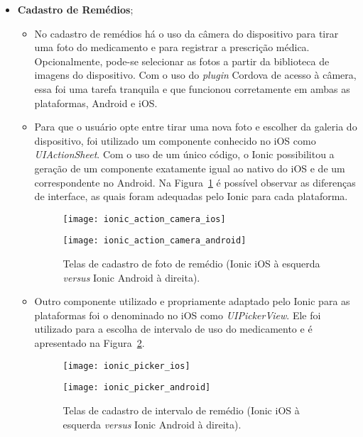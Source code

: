 \begin{itemize}
\begin{itemize}
		\end{itemize}

 	\item \textbf{Cadastro de Remédios};
 	
 		 \begin{itemize}
			\item No cadastro de remédios há o uso da câmera do dispositivo para tirar uma foto do medicamento e para registrar a prescrição médica. Opcionalmente, pode-se selecionar as fotos a partir da biblioteca de imagens do dispositivo. Com o uso do \textit{plugin} Cordova de acesso à câmera, essa foi uma tarefa tranquila e que funcionou corretamente em ambas as plataformas, Android e iOS. 
			\item Para que o usuário opte entre  tirar uma nova foto e escolher da galeria do dispositivo, foi utilizado um componente conhecido no iOS como \textit{UIActionSheet}. Com o uso de um único código, o Ionic possibilitou a geração de um componente exatamente igual ao nativo do iOS e de um correspondente no Android. 
			Na Figura~\ref{fig:ionic_action_camera} é possível observar as diferenças de interface, as quais foram adequadas pelo Ionic para cada plataforma.
			
			 \begin{figure}
			 	\centering
			 	\begin{minipage}{.5\textwidth}
			 		\centering
			 		\texttt{[image: ionic\_action\_camera\_ios]}
			 	\end{minipage}%
			 	\begin{minipage}{.5\textwidth}
			 		\centering
			 		\texttt{[image: ionic\_action\_camera\_android]}
			 	\end{minipage}
			 	\caption[Telas de cadastro de foto de remédio (Ionic iOS \textit{versus} Ionic Android)]{ Telas de cadastro de foto de remédio (Ionic iOS à esquerda \textit{versus} Ionic Android à direita).}
			 	\label{fig:ionic_action_camera}
			 \end{figure}

			\item Outro componente utilizado e propriamente adaptado pelo Ionic para as plataformas foi o denominado no iOS como \textit{UIPickerView}.
			Ele foi utilizado para a escolha de intervalo de uso do medicamento e é apresentado na Figura~\ref{fig:ionic_picker}.
			 
			 \begin{figure}
			 	\centering
			 	\begin{minipage}{.5\textwidth}
			 		\centering
			 		\texttt{[image: ionic\_picker\_ios]}
			 	\end{minipage}%
			 	\begin{minipage}{.5\textwidth}
			 		\centering
			 		\texttt{[image: ionic\_picker\_android]}
			 	\end{minipage}
			 	\caption[Telas de cadastro de intervalo de remédio (Ionic iOS \textit{versus} Ionic Android)]{ Telas de cadastro de intervalo de 
				 remédio (Ionic iOS à esquerda \textit{versus} Ionic Android à direita).}
			 	\label{fig:ionic_picker}
			 \end{figure}
			 

\end{itemize}
\end{itemize}
